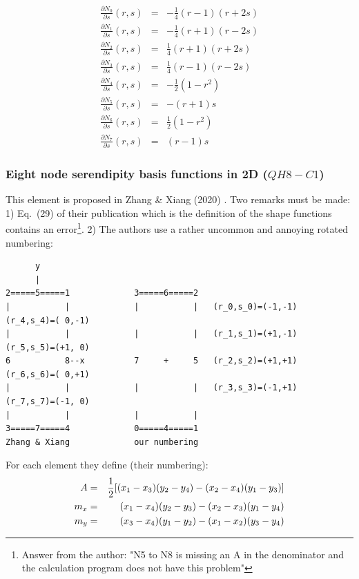 \begin{mdframed}[backgroundcolor=blue!5]
\begin{eqnarray}
\frac{\partial N_0}{\partial s}(r,s)&=& -\frac{1}{4}(r-1)(r+2s) \\
\frac{\partial N_1}{\partial s}(r,s)&=& -\frac{1}{4}(r+1)(r-2s) \\
\frac{\partial N_2}{\partial s}(r,s)&=&  \frac{1}{4}(r+1)(r+2s) \\
\frac{\partial N_3}{\partial s}(r,s)&=&  \frac{1}{4}(r-1)(r-2s) \\
\frac{\partial N_4}{\partial s}(r,s)&=& - \frac{1}{2}(1-r^2)\\
\frac{\partial N_5}{\partial s}(r,s)&=&  -(r+1)s \\
\frac{\partial N_6}{\partial s}(r,s)&=& \frac{1}{2} (1-r^2)\\
\frac{\partial N_7}{\partial s}(r,s)&=&  (r-1)s
\end{eqnarray}
\end{mdframed}



\subsubsection{Eight node serendipity basis functions in 2D ($QH8-C1$)}
\label{sec:serendipity2Db}
 

This element is proposed in Zhang \& Xiang (2020) \cite{zhxi20}. Two remarks
must be made: 1) Eq.~(29) of their publication which is the definition
of the shape functions contains an error\footnote{
Answer from the author: "N5 to N8 is missing an A in the denominator and 
the calculation program does not have this problem"}. 2) The authors use a rather 
uncommon and annoying rotated numbering:
\begin{verbatim}
      y
      |
2=====5=====1             3=====6=====2
|           |             |           |   (r_0,s_0)=(-1,-1)   (r_4,s_4)=( 0,-1)
|           |             |           |   (r_1,s_1)=(+1,-1)   (r_5,s_5)=(+1, 0)
6           8--x          7     +     5   (r_2,s_2)=(+1,+1)   (r_6,s_6)=( 0,+1)
|           |             |           |   (r_3,s_3)=(-1,+1)   (r_7,s_7)=(-1, 0)
|           |             |           |    
3=====7=====4             0=====4=====1
Zhang & Xiang             our numbering
\end{verbatim}

For each element they define (their numbering):
\begin{eqnarray}
A   &=& \frac{1}{2} [ (x_1-x_3)(y_2-y_4)-(x_2-x_4)(y_1-y_3) ] \nonumber\\
m_x &=& (x_1-x_4)(y_2-y_3)-(x_2-x_3)(y_1-y_4) \nonumber\\
m_y &=& (x_3-x_4)(y_1-y_2)-(x_1-x_2)(y_3-y_4) \nonumber
\end{eqnarray}

